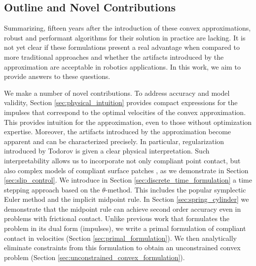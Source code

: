 \subsection{Outline and Novel Contributions}
Summarizing, fifteen years after the introduction of these convex
approximations, robust and performant algorithms for their solution in practice
are lacking. It is not yet clear if these formulations present a real advantage
when compared to more traditional approaches and whether the artifacts
introduced by the approximation are acceptable in robotics applications. In this
work, we aim to provide answers to these questions. 

We make a number of novel contributions. To address accuracy and model validity,
Section \ref{sec:physical_intuition} provides compact expressions for the
impulses that correspond to the optimal velocities of the convex approximation.
This provides intuition for the approximation, even to those without
optimization expertise. Moreover, the artifacts introduced by the approximation
become apparent and can be characterized precisely. In particular,
regularization introduced by Todorov \cite{bib:todorov2014} is given a clear
physical interpretation. Such interpretability  allows us to incorporate not
only compliant point contact, but also complex models of compliant surface
patches \cite{bib:elandt2019pressure}, as we demonstrate in Section
\ref{sec:slip_control}. We introduce in Section
\ref{sec:discrete_time_formulation} a time stepping approach based on the
$\theta\text{-method}$. This includes the popular symplectic Euler method and
the implicit midpoint rule. In Section \ref{sec:spring_cylinder} we demonstrate
that the midpoint rule can achieve second order accuracy even in problems with
frictional contact. Unlike previous work \cite{bib:anitescu2010,bib:todorov2014}
that formulates the problem in its dual form (impulses), we write a primal
formulation of compliant contact in velocities (Section
\ref{sec:primal_formulation}). We then analytically eliminate constraints from
this formulation to obtain an unconstrained convex problem (Section
\ref{sec:unconstrained_convex_formulation}).

